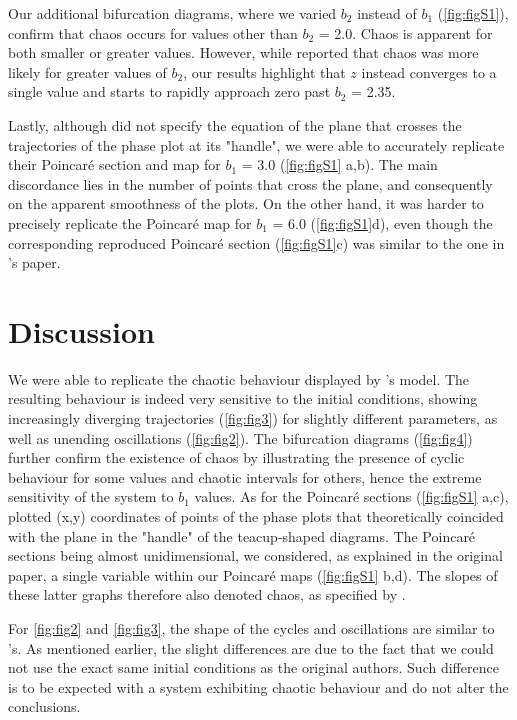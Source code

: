 Our additional bifurcation diagrams, where we varied $b_2$ instead of $b_1$ (\autoref{fig:figS1}),
confirm that chaos occurs for values other than $b_2$ = 2.0. Chaos is apparent for both
smaller or greater values.
However, while \citeauthor{hastings1991} reported that chaos was more likely for greater values of
$b_2$, our results highlight that $z$ instead converges to a single value and
starts to rapidly approach zero past $b_2$ = 2.35.

Lastly, although \citeauthor{hastings1991} did not specify the equation of the plane that
crosses the trajectories of the phase plot at its "handle", we were able to accurately
replicate their Poincaré section and map for $b_1$ = 3.0 (\autoref{fig:figS1} a,b). The main
discordance lies in the number of points that cross the plane, and consequently on the
apparent smoothness of the plots.
On the other hand, it was harder to precisely replicate the Poincaré map for $b_1$ = 6.0
(\autoref{fig:figS1}d), even though the corresponding reproduced Poincaré section (\autoref{fig:figS1}c)
was similar to the one in \citeauthor{hastings1991}'s paper.

\section{Discussion}

We were able to replicate the chaotic behaviour displayed by \citeauthor{hastings1991}'s model.
The resulting behaviour is indeed very sensitive to the initial conditions, showing
increasingly diverging trajectories (\autoref{fig:fig3}) for slightly different parameters, as well
as unending oscillations (\autoref{fig:fig2}). The bifurcation diagrams (\autoref{fig:fig4}) further confirm
the existence of chaos by illustrating the presence of cyclic behaviour for some values
and chaotic intervals for others, hence the extreme sensitivity of the system to $b_1$
values. As for the Poincaré sections (\autoref{fig:figS1} a,c), \citeauthor{hastings1991} plotted (x,y)
coordinates of points of the phase plots that theoretically coincided with the plane in
the "handle" of the teacup-shaped diagrams.
The Poincaré sections being almost unidimensional, we considered, as explained in the
original paper, a single variable within our Poincaré maps (\autoref{fig:figS1} b,d). The slopes
of these latter graphs therefore also denoted chaos, as specified by \citeauthor{hastings1991}.

For \autoref{fig:fig2} and \autoref{fig:fig3}, the shape of the cycles and oscillations are similar to
\citeauthor{hastings1991}'s.
As mentioned earlier, the slight differences are due to the fact that we could not use the
exact same initial conditions as the original authors.
Such difference is to be expected with a system exhibiting chaotic behaviour and do not
alter the conclusions.

